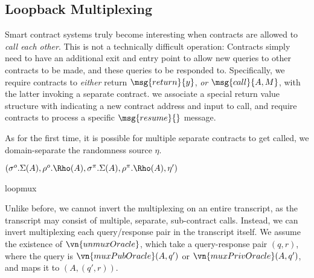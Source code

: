 \subsection{Loopback Multiplexing}
\label{sec:loopmux}

Smart contract systems truly become interesting when contracts are allowed to
\emph{call each other}. This is not a technically difficult operation: Contracts
simply need to have an additional exit and entry point to allow new queries to
other contracts to be made, and these queries to be responded to. Specifically,
we require contracts to \emph{either} return $\msg{return}{y}$, \emph{or}
$\msg{call}{A, M}$, with the latter invoking a separate contract. we associate a
special return value structure with indicating a new contract address and input
to call, and require contracts to process a specific $\msg{resume}{}$ message.

As for the first time, it is possible for multiple separate contracts to get
called, we domain-separate the randomness source $\eta$.

\begin{algorithmic}
    \State \Return $(\sigma^o.\Sigma(A), \rho^o.\Rho(A), \sigma^\pi.\Sigma(A),
      \rho^\pi.\Rho(A), \eta')$
  \EndFunction
\end{algorithmic}

{loopmux}

\sloppy
Unlike before, we cannot invert the multiplexing on an entire transcript, as the
transcript may consist of multiple, separate, sub-contract calls. Instead, we
can invert multiplexing each query/response pair in the transcript itself. We
assume the existence of $\vn{unmuxOracle}$, which take a query-response pair
$(q, r)$, where the query is $\vn{muxPubOracle}(A, q')$ or
$\vn{muxPrivOracle}(A, q')$, and maps it to $(A, (q', r))$.

